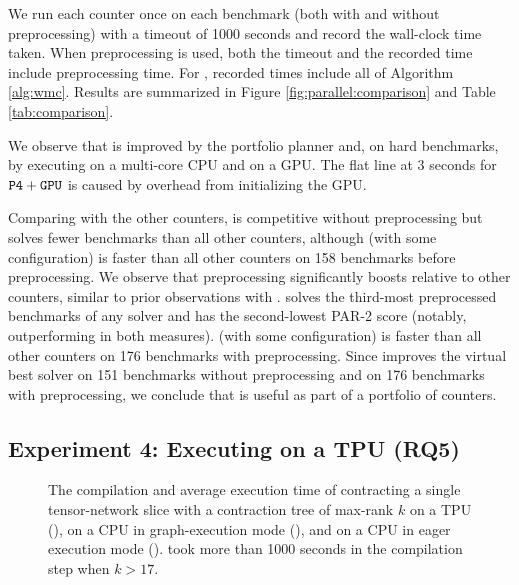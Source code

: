 We run each counter once on each benchmark (both with and without  preprocessing) with a timeout of 1000 seconds and record the wall-clock time taken. When preprocessing is used, both the timeout and the recorded time include preprocessing time. For , recorded times include all of Algorithm \ref{alg:wmc}. Results are summarized in Figure \ref{fig:parallel:comparison} and Table \ref{tab:comparison}. 

We observe that  is improved by the portfolio planner and, on hard benchmarks, by executing on a multi-core CPU and on a GPU. The flat line at 3 seconds for $\texttt{\upshape P4}+\texttt{\upshape GPU}$ is caused by overhead from initializing the GPU.

Comparing  with the other counters,  is competitive without preprocessing but solves fewer benchmarks than all other counters, although  (with some configuration) is faster than all other counters on 158 benchmarks before preprocessing. 
We observe that preprocessing significantly boosts  relative to other counters, similar to prior observations with  \cite{FHZ19}.  solves the third-most preprocessed benchmarks of any solver and has the second-lowest PAR-2 score (notably, outperforming  in both measures).  (with some configuration) is faster than all other counters on 176 benchmarks with preprocessing. Since  improves the virtual best solver on 151 benchmarks without preprocessing and on 176 benchmarks with preprocessing, we conclude that  is useful as part of a portfolio of counters.

\subsection{Experiment 4: Executing on a TPU (RQ5)}
\label{sec:parallel:exp:tpu}
\begin{figure}[t]
\begin{center}

%
\vspace*{-0.9cm}
\caption{\label{fig:parallel:tpu} The compilation and average execution time of contracting a single tensor-network slice with a contraction tree of max-rank $k$ on a TPU (), on a CPU in graph-execution mode (), and on a CPU in eager execution mode ().  took more than 1000 seconds in the compilation step when $k > 17$.}
\end{center}
\vspace*{-0.8cm}
\end{figure}

